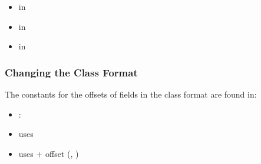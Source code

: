 \begin{itemize}
    \item {} in 
    \item {} in 
    \item {} in 
\end{itemize}

\subsubsection{Changing the Class Format}

The constants for the offsets of fields in the class format are found
in:

\begin{itemize}
    \item {}: 
    \item {} uses 
    \item {} uses  + offset
        (, )
\end{itemize}




%
%
